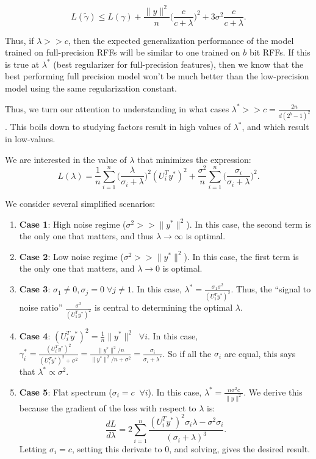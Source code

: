\documentclass[12pt]{article}
\begin{document}
$$L(\tilde{\gamma}) \leq L(\gamma) + \frac{\|y\|^2}{n}\bigg(\frac{c}{c+\lambda}\bigg)^2 + 3\sigma^2\frac{c}{c+\lambda}.$$

Thus, if $\lambda >> c$, then the expected generalization performance of the model trained on full-precision RFFs will be similar to one trained on $b$ bit RFFs.  If this is true at $\lambda^*$ (best regularizer for full-precision features), then we know that the best performing full precision model won't be much better than the low-precision model using the same regularization constant.

Thus, we turn our attention to understanding in what cases $\lambda^* >> c = \frac{2n}{d(2^b -1)^2}$.  This boils down to studying factors result in high values of $\lambda^*$, and which result in low-values.

We are interested in the value of $\lambda$ that minimizes the expression:
$$L(\lambda) = \frac{1}{n}\sum_{i=1}^n \bigg(\frac{\lambda}{\sigma_i + \lambda}\bigg)^2 (U_i^T y^*)^2 + \frac{\sigma^2}{n}\sum_{i=1}^n \bigg(\frac{\sigma_i}{\sigma_i + \lambda}\bigg)^2.$$

We consider several simplified scenarios:
\begin{enumerate}
	\item \textbf{Case 1}: High noise regime ($\sigma^2 >> \|y^*\|^2$).  In this case, the second term is the only one that matters, and thus $\lambda \rightarrow \infty$ is optimal.
	\item \textbf{Case 2}: Low noise regime ($\sigma^2 >> \|y^*\|^2$).  In this case, the first term is the only one that matters, and $\lambda \rightarrow 0$ is optimal.
	\item \textbf{Case 3}: $\sigma_1 \neq 0, \sigma_j = 0 \;\forall j \neq 1$. In this case, $\lambda^* = \frac{\sigma_1 \sigma^2}{(U_1^T y^*)^2}$.  Thus, the ``signal to noise ratio'' $\frac{\sigma^2}{(U_1^T y^*)^2}$ is central to determining the optimal $\lambda$.
	\item \textbf{Case 4}: $(U_i^T y^*)^2 = \frac{1}{n}\|y^*\|^2\;\; \forall i$.  In this case, $\gamma_i^*= \frac{(U_i^T y^*)^2}{(U_i^T y^*)^2 + \sigma^2} = \frac{\|y^*\|^2/n}{\|y^*\|^2/n + \sigma^2} = \frac{\sigma_i}{\sigma_i + \lambda^*}$.  So if all the $\sigma_i$ are equal, this says that $\lambda^* \propto \sigma^2$.
	\item \textbf{Case 5}: Flat spectrum ($\sigma_i = c \; \; \forall i$).  In this case, $\lambda^* = \frac{n\sigma^2 c}{\|y\|^2}$.  We derive this because the gradient of the loss with respect to $\lambda$ is:
	$$ \frac{dL}{d\lambda} = 2\sum_{i=1}^n \frac{(U_i^T y^*)^2 \sigma_i \lambda - \sigma^2 \sigma_i}{(\sigma_i + \lambda)^3}.$$
	Letting $\sigma_i = c$, setting this derivate to 0, and solving, gives the desired result.
\end{enumerate}
\end{document}
